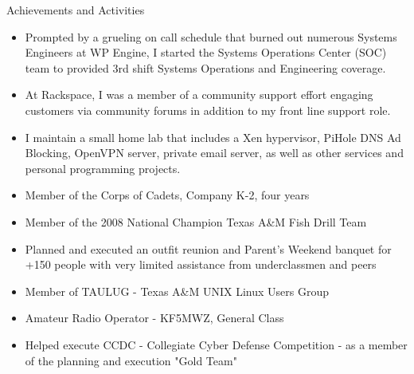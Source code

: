 \documentclass[10pt,oneside]{article}
\newenvironment{ressection}[1]{
    \vspace{4pt}
    {\fontfamily{phv}\selectfont\Large#1}
    \begin{itemize}
    \vspace{3pt}
}{
    \end{itemize}
}
\newcommand{\resitem}[1]{
    \vspace{-4pt}
    \item \begin{flushleft} #1 \end{flushleft}
}
\begin{document}
\begin{ressection}{Achievements and Activities}
    \resitem{Prompted by a grueling on call schedule that burned out numerous Systems Engineers at WP Engine, I started the Systems Operations Center (SOC) team to provided 3rd shift Systems Operations and Engineering coverage.}
    \resitem{At Rackspace, I was a member of a community support effort engaging customers via community forums in addition to my front line support role.}
    \resitem{I maintain a small home lab that includes a Xen hypervisor, PiHole DNS Ad Blocking, OpenVPN server, private email server, as well as other services and personal programming projects.}
    \resitem{Member of the Corps of Cadets, Company K-2, four years}
    \resitem{Member of the 2008 National Champion Texas A\&M Fish Drill Team}
    \resitem{Planned and executed an outfit reunion and Parent's Weekend banquet for +150 people with very limited assistance from underclassmen and peers}
    \resitem{Member of TAULUG - Texas A\&M UNIX Linux Users Group}
    \resitem{Amateur Radio Operator - KF5MWZ, General Class}
    \resitem{Helped execute CCDC - Collegiate Cyber Defense Competition - as a member of the planning and execution "Gold Team"}
\end{ressection}
\end{document}
